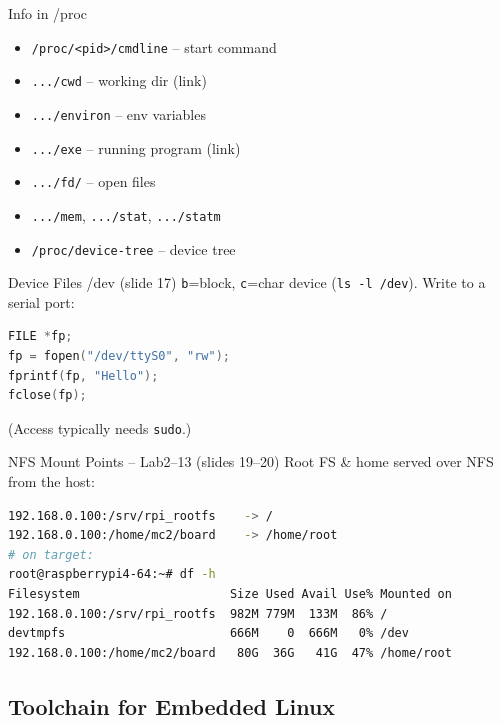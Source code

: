 
\begin{definition}{Info in /proc}
    \begin{itemize}
        \item \texttt{/proc/<pid>/cmdline} -- start command
        \item \texttt{.../cwd} -- working dir (link)
        \item \texttt{.../environ} -- env variables
        \item \texttt{.../exe} -- running program (link)
        \item \texttt{.../fd/} -- open files
        \item \texttt{.../mem}, \texttt{.../stat}, \texttt{.../statm}
        \item \texttt{/proc/device-tree} -- device tree
    \end{itemize}
\end{definition}

\begin{examplecode}{Device Files /dev (slide 17)}
    \texttt{b}=block, \texttt{c}=char device (\texttt{ls -l /dev}). Write to a serial port:
\begin{lstlisting}[language=C, style=basesmol, aboveskip=2pt, belowskip=2pt]
FILE *fp;
fp = fopen("/dev/ttyS0", "rw");
fprintf(fp, "Hello");
fclose(fp);
\end{lstlisting}
    (Access typically needs \texttt{sudo}.)
\end{examplecode}

\multend

\begin{examplecode}{NFS Mount Points -- Lab2--13 (slides 19--20)}
    Root FS \& home served over NFS from the host:
\begin{lstlisting}[language=bash, style=basesmol, aboveskip=2pt, belowskip=2pt]
192.168.0.100:/srv/rpi_rootfs    -> /
192.168.0.100:/home/mc2/board    -> /home/root
# on target:
root@raspberrypi4-64:~# df -h
Filesystem                     Size Used Avail Use% Mounted on
192.168.0.100:/srv/rpi_rootfs  982M 779M  133M  86% /
devtmpfs                       666M    0  666M   0% /dev
192.168.0.100:/home/mc2/board   80G  36G   41G  47% /home/root
\end{lstlisting}
\end{examplecode}

\subsection{Toolchain for Embedded Linux}

